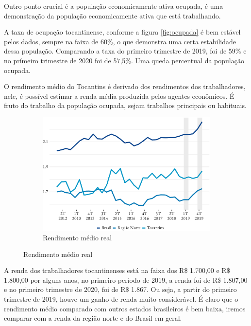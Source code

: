 \par Outro ponto crucial é a população economicamente ativa ocupada, é uma demonstração da população economicamente ativa que está trabalhando.



\par  A taxa de ocupação tocantinense, conforme a figura \ref{fig:ocupada} é bem estável pelos dados, sempre na faixa de 60\%, o que demonstra uma certa estabilidade dessa população. Comparando a taxa do primeiro trimestre de 2019, foi de 59\% e no prímeiro trimestre de 2020 foi de 57,5\%. Uma queda percentual da população ocupada.



\par O rendimento médio do Tocantins é derivado dos rendimentos dos trabalhadores, nele, é possível estimar a renda média produzida pelos agentes econômicos. É fruto do trabalho da população ocupada, sejam trabalhos principais ou habituais.

\begin{figure}[!h]
	\begin{subfigure}{\linewidth}
		\caption{Rendimento médio real}
		\includegraphics{fig/rend_medio-1.pdf}
		\notes{\trimestres}
	\end{subfigure}
\end{figure}


\par A renda dos trabalhadores tocantinenses está na faixa dos R\$ 1.700,00 e R\$ 1.800,00 por alguns anos, no primeiro período de 2019, a renda foi de R\$ 1.807,00 e no primeiro trimestre de 2020, foi de R\$ 1.867. Ou seja, a partir do primeiro trimestre de 2019, houve um ganho de renda muito considerável. É claro que o rendimento médio comparado com outros estados brasileiros é bem baixa, iremos comparar com a renda da região norte e do Brasil em geral.


